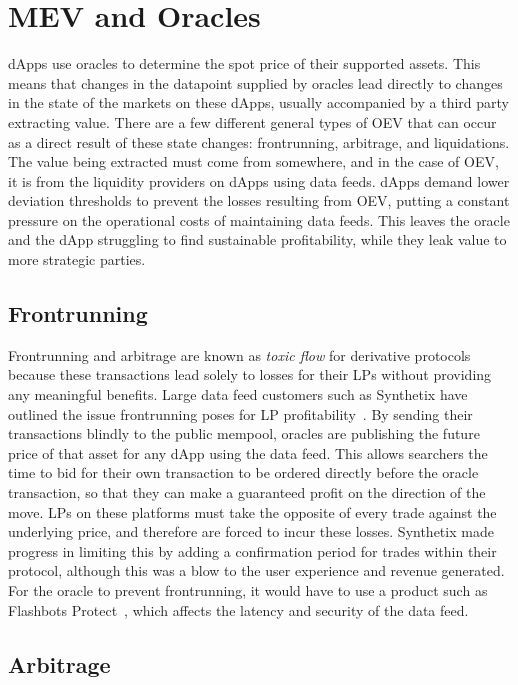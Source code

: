 \documentclass[11pt]{article}
\begin{document}
\section{MEV and Oracles}

dApps use oracles to determine the spot price of their supported assets.
This means that changes in the datapoint supplied by oracles lead directly to changes in the state of the markets on these dApps, usually accompanied by a third party extracting value.
There are a few different general types of OEV that can occur as a direct result of these state changes: frontrunning, arbitrage, and liquidations.
The value being extracted must come from somewhere, and in the case of OEV, it is from the liquidity providers on dApps using data feeds.
dApps demand lower deviation thresholds to prevent the losses resulting from OEV, putting a constant pressure on the operational costs of maintaining data feeds.
This leaves the oracle and the dApp struggling to find sustainable profitability, while they leak value to more strategic parties.

\subsection{Frontrunning}

Frontrunning and arbitrage are known as \textit{toxic flow} for derivative protocols because these transactions lead solely to losses for their LPs without providing any meaningful benefits. 
Large data feed customers such as Synthetix have outlined the issue frontrunning poses for LP profitability~\cite{sip-37}.
By sending their transactions blindly to the public mempool, oracles are publishing the future price of that asset for any dApp using the data feed.
This allows searchers the time to bid for their own transaction to be ordered directly before the oracle transaction, so that they can make a guaranteed profit on the direction of the move.
LPs on these platforms must take the opposite of every trade against the underlying price, and therefore are forced to incur these losses.
Synthetix made progress in limiting this by adding a confirmation period for trades within their protocol, although this was a blow to the user experience and revenue generated.
For the oracle to prevent frontrunning, it would have to use a product such as Flashbots Protect~\cite{flashbots-protect}, which affects the latency and security of the data feed.

\subsection{Arbitrage}
\end{document}
